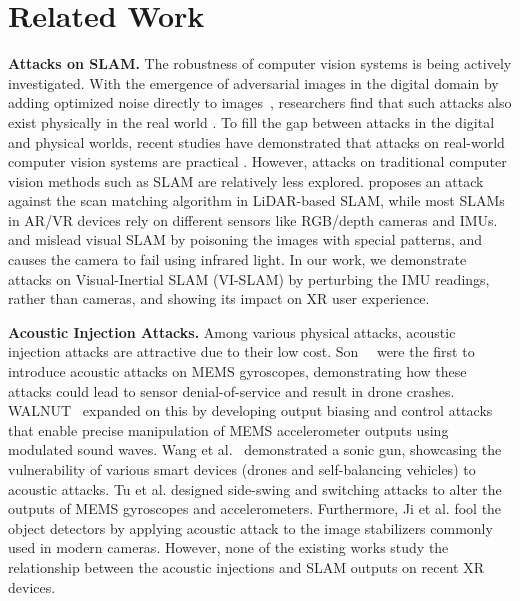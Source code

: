 
\section{Related Work} \label{sec:related}

\textbf{Attacks on SLAM.} 
The robustness of computer vision systems is being actively investigated. With the emergence of adversarial images in the digital domain by adding optimized noise directly to images~\cite{szegedy2013intriguing,carlini2017towards}, researchers find that such attacks also exist physically in the real world \cite{eykholt2018robust,song2018physical,zhao2019seeing}. To fill the gap between attacks in the digital and physical worlds, recent studies have demonstrated that attacks on real-world computer vision systems are practical \cite{eykholt2018robust,li2019adversarial,man2020ghostimage,sharif2016accessorize,zhao2019seeing,zhou2018invisible}. However, attacks on traditional computer vision methods such as SLAM are relatively less explored. \cite{yoshida2022adversarial} proposes an attack against the scan matching algorithm in LiDAR-based SLAM, while most SLAMs in AR/VR devices rely on different sensors like RGB/depth cameras and IMUs. \cite{ikram2022perceptual} and \cite{chen2024adversary} mislead visual SLAM by poisoning the images with special patterns, and \cite{wang2021can} causes the camera to fail using infrared light. In our work, we demonstrate attacks on Visual-Inertial SLAM (VI-SLAM) by perturbing the IMU readings, rather than cameras, and showing its impact on XR user experience. 

\textbf{Acoustic Injection Attacks.} Among various physical attacks, acoustic injection attacks are attractive due to their low cost. Son~\etal~\cite{son2015rocking} were the first to introduce acoustic attacks on MEMS gyroscopes, demonstrating how these attacks could lead to sensor denial-of-service and result in drone crashes. WALNUT~\cite{trippel2017walnut} expanded on this by developing output biasing and control attacks that enable precise manipulation of MEMS accelerometer outputs using modulated sound waves. Wang et al.~\cite{wang2017sonic} demonstrated a sonic gun, showcasing the vulnerability of various smart devices (\eg drones and self-balancing vehicles) to acoustic attacks. Tu et al. \cite{tu2018injected} designed side-swing and switching attacks to alter the outputs of MEMS gyroscopes and accelerometers. Furthermore, Ji et al. \cite{ji2021poltergeist} fool the object detectors by applying acoustic attack to the image stabilizers commonly used in modern cameras. However, none of the existing works study the relationship between the acoustic injections and SLAM outputs on recent XR devices. 

